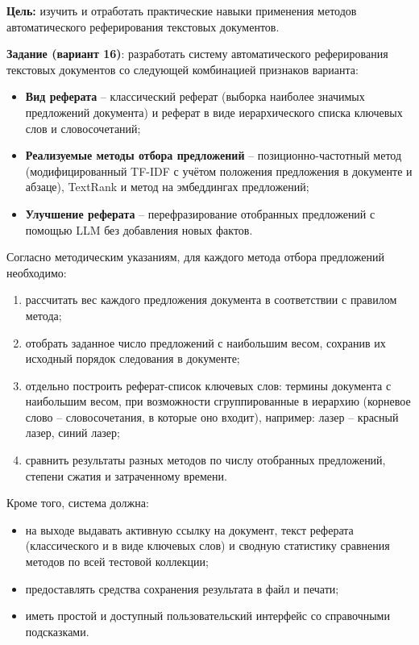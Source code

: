 
\textbf{Цель:} изучить и отработать практические навыки применения
методов автоматического реферирования текстовых документов.

\vspace{1em}

\textbf{Задание (вариант 16)}: разработать систему автоматического
реферирования текстовых документов со следующей комбинацией признаков
варианта:
\begin{itemize}
  \item \textbf{Вид реферата} -- классический реферат (выборка наиболее
  значимых предложений документа) и реферат в виде иерархического
  списка ключевых слов и словосочетаний;
  \item \textbf{Реализуемые методы отбора предложений} --
  позиционно-частотный метод (модифицированный TF-IDF с учётом
  положения предложения в документе и абзаце), TextRank и метод на
  эмбеддингах предложений;
  \item \textbf{Улучшение реферата} -- перефразирование отобранных
  предложений с помощью LLM без добавления новых фактов.
\end{itemize}

\vspace{1em}

Согласно методическим указаниям, для каждого метода отбора предложений
необходимо:
\begin{enumerate}
  \item рассчитать вес каждого предложения документа в соответствии с
  правилом метода;
  \item отобрать заданное число предложений с наибольшим весом,
  сохранив их исходный порядок следования в документе;
  \item отдельно построить реферат-список ключевых слов: термины
  документа с наибольшим весом, при возможности сгруппированные в
  иерархию (корневое слово -- словосочетания, в которые оно входит),
  например: лазер -- красный лазер, синий лазер;
  \item сравнить результаты разных методов по числу отобранных
  предложений, степени сжатия и затраченному времени.
\end{enumerate}

Кроме того, система должна:
\begin{itemize}
  \item на выходе выдавать активную ссылку на документ, текст реферата
  (классического и в виде ключевых слов) и сводную статистику
  сравнения методов по всей тестовой коллекции;
  \item предоставлять средства сохранения результата в файл и печати;
  \item иметь простой и доступный пользовательский интерфейс со
  справочными подсказками.
\end{itemize}
